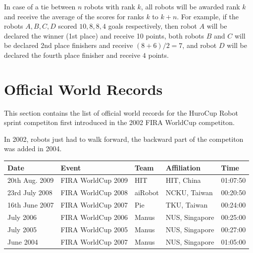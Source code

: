 \documentclass[12pt]{hurocup}
\begin{document}
\begin{lawlist}[RD]
\item In case of a tie between $n$ robots with rank $k$, all robots
 will be awarded rank $k$ and receive the average of the scores for
 ranks $k$ to $k+n$.  For example, if the robots $A,B,C,D$ scored $10,
 8, 8, 4$ goals respectively, then robot $A$ will be declared the
 winner (1st place) and receive 10 points, both robots $B$ and $C$
 will be declared 2nd place finishers and receive $(8+6)/2=7$, and
 robot $D$ will be declared the fourth place finisher and receive $4$
 points.

\end{lawlist}

\section{Official World Records}
\label{sec:worldrecords}

This section contains the list of official world records for the
HuroCup Robot sprint competiton first introduced in the 2002 FIRA
WorldCup competiton.

In 2002, robots just had to walk forward, the backward part of the
competiton was added in 2004.

\begin{center}
\begin{tabular}{|lllll|}
\hline
Date & Event & Team & Affiliation & Time \\
\hline
20th Aug. 2009 & FIRA WorldCup 2009 & HIT & HIT, China   & 01:07:50 \\
23rd July 2008 & FIRA WorldCup 2008 & aiRobot  & NCKU, Taiwan   & 00:20:50 \\
16th June 2007 & FIRA WorldCup 2007 & Pie      & TKU, Taiwan    & 00:24:00 \\
     July 2006 & FIRA WorldCup 2006 & Manus    & NUS, Singapore & 00:25:00 \\
     July 2005 & FIRA WorldCup 2005 & Manus    & NUS, Singapore & 00:27:00 \\
     June 2004 & FIRA WorldCup 2007 & Manus    & NUS, Singapore & 01:05:00 \\
\hline
\end{tabular}
\end{center}
\end{document}
